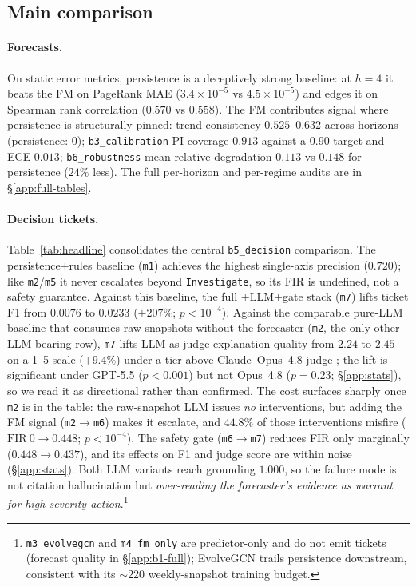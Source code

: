 \subsection{Main comparison}
\paragraph{Forecasts.}
On static error metrics, persistence is a deceptively strong
baseline: at $h\!=\!4$ it beats the FM on PageRank MAE
($3.4\!\times\!10^{-5}$ vs $4.5\!\times\!10^{-5}$) and edges it on
Spearman rank correlation ($0.570$ vs $0.558$). The FM contributes signal where
persistence is structurally pinned: trend consistency
$0.525$--$0.632$ across horizons (persistence: $0$);
\texttt{b3\_calibration} PI coverage $0.913$ against a $0.90$
target and ECE $0.013$; \texttt{b6\_robustness} mean relative
degradation $0.113$ vs $0.148$ for persistence ($24\%$ less). The
full per-horizon and per-regime audits are in
\S\ref{app:full-tables}.

\paragraph{Decision tickets.}
Table~\ref{tab:headline} consolidates the central
\texttt{b5\_decision} comparison. The persistence$+$rules baseline
(\texttt{m1}) achieves the highest single-axis precision
($0.720$); like \texttt{m2}/\texttt{m5} it never escalates beyond
\texttt{Investigate}, so its FIR is undefined, not a safety
guarantee. Against this baseline, the full
\fmname$+$LLM$+$gate stack (\texttt{m7}) lifts ticket F1 from
$0.0076$ to $0.0233$ ($+207\%$; $p\!<\!10^{-4}$). Against the comparable pure-LLM
baseline that consumes raw snapshots without the forecaster
(\texttt{m2}, the only other LLM-bearing row), \texttt{m7} lifts
LLM-as-judge explanation quality from $2.24$ to $2.45$ on a 1--5
scale ($+9.4\%$) under a tier-above Claude~Opus~4.8 judge
\citep{Zheng2023LLMJudge}; the lift is significant under GPT-5.5
($p\!<\!0.001$) but not Opus~4.8 ($p\!=\!0.23$;
\S\ref{app:stats}), so we read it as directional rather than
confirmed. The
cost surfaces sharply once \texttt{m2} is in the table: the
raw-snapshot LLM issues \emph{no} interventions, but adding the FM
signal (\texttt{m2}$\!\to\!$\texttt{m6}) makes it escalate, and
$44.8\%$ of those interventions misfire
($\mathrm{FIR}~0\!\to\!0.448$; $p\!<\!10^{-4}$). The safety gate
(\texttt{m6}$\!\to\!$\texttt{m7}) reduces FIR only marginally
($0.448\!\to\!0.437$), and its effects on F1 and judge score are
within noise (\S\ref{app:stats}). Both LLM variants
reach grounding $1.000$, so the failure mode is not citation
hallucination but \emph{over-reading the forecaster's evidence as
warrant for high-severity action}.\footnote{\texttt{m3\_evolvegcn}
and \texttt{m4\_fm\_only} are predictor-only and do not emit
tickets (forecast quality in \S\ref{app:b1-full}); EvolveGCN
trails persistence downstream, consistent with its $\sim$220
weekly-snapshot training budget.}

